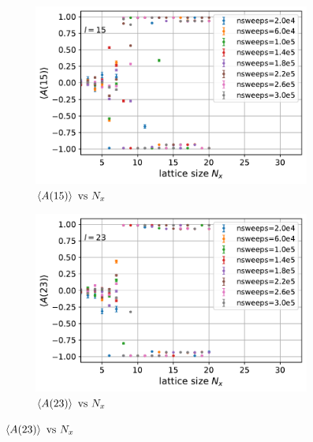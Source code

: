 \documentclass[../thesis_main.tex]{subfiles}
\begin{document}
\begin{figure}[!htb]\ContinuedFloat
    \centering
    \begin{subfigure}[b]{0.47\textwidth}  %
        \centering
        \includegraphics[width=\textwidth]{images/expval(A_l)_vs_N_x/A vs N_x (l=15).pdf}
        \caption{$\expval{A(15)} \text{ vs } N_x$}
    \end{subfigure}
    \hspace{1em}  %
    \vspace{1em}
    \begin{subfigure}[b]{0.47\textwidth}
        \centering
        \includegraphics[width=\textwidth]{images/expval(A_l)_vs_N_x/A vs N_x (l=23).pdf}
        \caption{$\expval{A(23)} \text{ vs } N_x$}
    \end{subfigure}
\end{figure}
\end{document}
